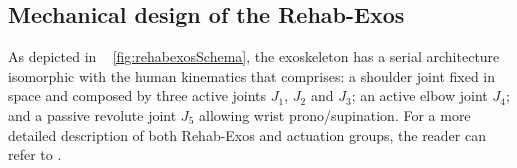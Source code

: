 \subsection{Mechanical design of the Rehab-Exos} 
\label{subsec:mechanicalDesign}
As depicted  in \figurename \ \DIFdelbegin {}%
\DIFdelend \ref{fig:rehabexosSchema}, the exoskeleton has a serial architecture isomorphic with the human kinematics that comprises: a shoulder joint  fixed in space and composed by three active joints $J_1$, $J_2$ and $J_3$; an active elbow joint $J_4$; and a passive revolute joint $J_5$ allowing  \DIFdelbegin {}\DIFdelend wrist prono/supination.  For a more detailed description of both Rehab-Exos and actuation groups, the reader can refer to \cite{vertechy2009development}.
\DIFdelbegin %
{%
}
\DIFdelend \DIFaddbegin 

